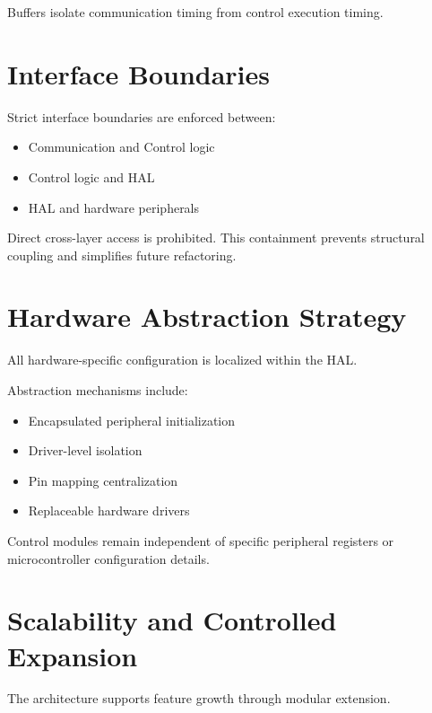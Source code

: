 Buffers isolate communication timing from control execution timing.


\section{Interface Boundaries}

Strict interface boundaries are enforced between:

\begin{itemize}
	\item Communication and Control logic
	\item Control logic and HAL
	\item HAL and hardware peripherals
\end{itemize}

Direct cross-layer access is prohibited.  
This containment prevents structural coupling and simplifies future refactoring.


\section{Hardware Abstraction Strategy}

All hardware-specific configuration is localized within the HAL.

Abstraction mechanisms include:

\begin{itemize}
	\item Encapsulated peripheral initialization
	\item Driver-level isolation
	\item Pin mapping centralization
	\item Replaceable hardware drivers
\end{itemize}

Control modules remain independent of specific peripheral registers or microcontroller configuration details.


\section{Scalability and Controlled Expansion}

The architecture supports feature growth through modular extension.

